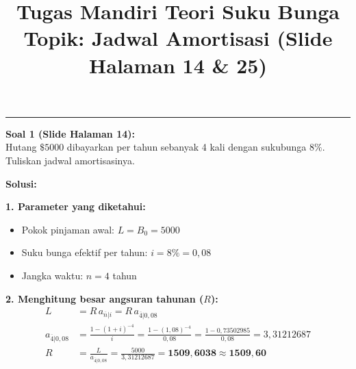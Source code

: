 \documentclass[11pt,a4paper]{article}
\title{\vspace{-1.5cm}\textbf{Tugas Mandiri Teori Suku Bunga}\\\large Topik: Jadwal Amortisasi (Slide Halaman 14 \& 25)\vspace{-0.8cm}}
\author{}
\date{}
\begin{document}
\maketitle

\vspace{-0.5em}
\hrule
\vspace{0.8em}

\begin{tcolorbox}
\textbf{Soal 1 (Slide Halaman 14):}\\
Hutang $\$5000$ dibayarkan per tahun sebanyak 4 kali dengan sukubunga $8\%$. Tuliskan jadwal amortisasinya.
\end{tcolorbox}

\textbf{Solusi:}

\textbf{1. Parameter yang diketahui:}
\begin{itemize}[leftmargin=1.5em, topsep=0pt, itemsep=0pt]
    \item Pokok pinjaman awal: $L = B_0 = 5000$
    \item Suku bunga efektif per tahun: $i = 8\% = 0{,}08$
    \item Jangka waktu: $n = 4$ tahun
\end{itemize}

\textbf{2. Menghitung besar angsuran tahunan ($R$):}
\begin{align*}
    L &= R \, a_{\overline{n}|i} = R \, a_{\overline{4}|0{,}08} \\[0.3em]
    a_{\overline{4}|0{,}08} &= \frac{1 - (1 + i)^{-4}}{i} = \frac{1 - (1{,}08)^{-4}}{0{,}08} = \frac{1 - 0{,}73502985}{0{,}08} = 3{,}31212687 \\[0.3em]
    R &= \frac{L}{a_{\overline{4}|0{,}08}} = \frac{5000}{3{,}31212687} = \mathbf{1509{,}6038 \approx 1509{,}60}
\end{align*}
\end{document}
